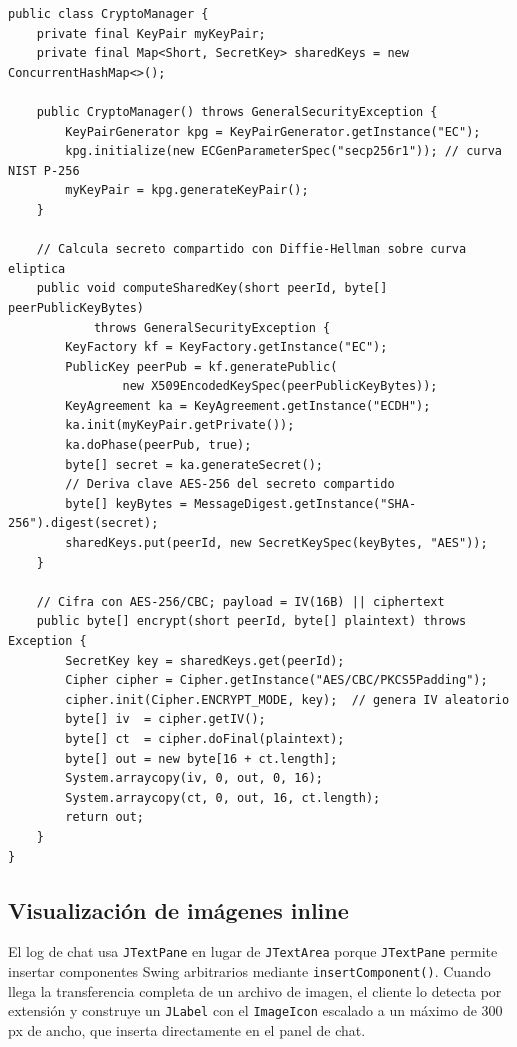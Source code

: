 \documentclass[12pt,a4paper]{article}
\begin{document}
\begin{lstlisting}[style=java, caption={CryptoManager.java --- intercambio de claves y cifrado}]
public class CryptoManager {
    private final KeyPair myKeyPair;
    private final Map<Short, SecretKey> sharedKeys = new ConcurrentHashMap<>();

    public CryptoManager() throws GeneralSecurityException {
        KeyPairGenerator kpg = KeyPairGenerator.getInstance("EC");
        kpg.initialize(new ECGenParameterSpec("secp256r1")); // curva NIST P-256
        myKeyPair = kpg.generateKeyPair();
    }

    // Calcula secreto compartido con Diffie-Hellman sobre curva eliptica
    public void computeSharedKey(short peerId, byte[] peerPublicKeyBytes)
            throws GeneralSecurityException {
        KeyFactory kf = KeyFactory.getInstance("EC");
        PublicKey peerPub = kf.generatePublic(
                new X509EncodedKeySpec(peerPublicKeyBytes));
        KeyAgreement ka = KeyAgreement.getInstance("ECDH");
        ka.init(myKeyPair.getPrivate());
        ka.doPhase(peerPub, true);
        byte[] secret = ka.generateSecret();
        // Deriva clave AES-256 del secreto compartido
        byte[] keyBytes = MessageDigest.getInstance("SHA-256").digest(secret);
        sharedKeys.put(peerId, new SecretKeySpec(keyBytes, "AES"));
    }

    // Cifra con AES-256/CBC; payload = IV(16B) || ciphertext
    public byte[] encrypt(short peerId, byte[] plaintext) throws Exception {
        SecretKey key = sharedKeys.get(peerId);
        Cipher cipher = Cipher.getInstance("AES/CBC/PKCS5Padding");
        cipher.init(Cipher.ENCRYPT_MODE, key);  // genera IV aleatorio
        byte[] iv  = cipher.getIV();
        byte[] ct  = cipher.doFinal(plaintext);
        byte[] out = new byte[16 + ct.length];
        System.arraycopy(iv, 0, out, 0, 16);
        System.arraycopy(ct, 0, out, 16, ct.length);
        return out;
    }
}
\end{lstlisting}

\subsection{Visualización de imágenes inline}

El log de chat usa \texttt{JTextPane} en lugar de \texttt{JTextArea} porque
\texttt{JTextPane} permite insertar componentes Swing arbitrarios mediante
\texttt{insertComponent()}. Cuando llega la transferencia completa de un
archivo de imagen, el cliente lo detecta por extensión y construye un
\texttt{JLabel} con el \texttt{ImageIcon} escalado a un máximo de 300 px de
ancho, que inserta directamente en el panel de chat.
\end{document}
